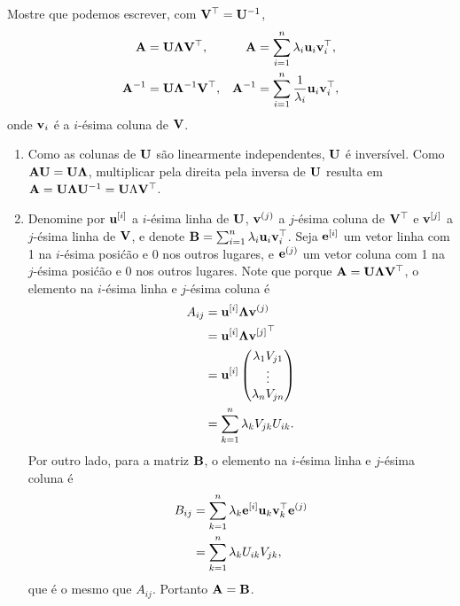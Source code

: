 \begin{exenumerate}
    \item Mostre que podemos escrever, com $\mathbf{V}^\top=\mathbf{U}^{-1}$,
    \begin{align}
        \mathbf{A} &= \mathbf{U} \mathbf{\Lambda} \mathbf{V}^\top,&     \mathbf{A} &= \sum_{i=1}^n \lambda_i \mathbf{u}_i\mathbf{v}_i^\top,\\
        \mathbf{A}^{-1} &= \mathbf{U} \mathbf{\Lambda}^{-1} \mathbf{V}^\top, & \mathbf{A}^{-1} &= \sum_{i=1}^n \frac{1}{\lambda_i} \mathbf{u}_i\mathbf{v}_i^\top,
    \end{align}
    onde $\mathbf{v}_i$ \'e a $i$-\'esima coluna de $\mathbf{V}$.
    \begin{solution}
        \begin{enumerate}
            \item[(i)] Como as colunas de $\mathbf{U}$ s\~ao linearmente independentes,
            $\mathbf{U}$ \'e invers\'ivel. Como $\mathbf{A}\mathbf{U} = \mathbf{U}\mathbf{\Lambda}$, multiplicar pela
            direita pela inversa de $\mathbf{U}$ resulta em $\mathbf{A} = \mathbf{U}\mathbf{\Lambda} \mathbf{U}^{-1} =
            \mathbf{U}\Lambda \mathbf{V}^\top$.
            \item[(ii)] Denomine por $\mathbf{u}^{[i]}$ a $i$-\'esima linha de $\mathbf{U}$,
            $\mathbf{v}^{(j)}$ a $j$-\'esima coluna de $\mathbf{V}^\top$ e $\mathbf{v}^{[j]}$
            a $j$-\'esima linha de $\mathbf{V}$, e denote $\mathbf{B} = \sum_{i=1}^n
            \lambda_i\mathbf{u}_i\mathbf{v}_i^\top$. Seja $\mathbf{e}^{[i]}$ um vetor linha
            com 1 na $i$-\'esima posi\'c\~ao e 0 nos outros lugares, e $\mathbf{e}^{(j)}$ um
            vetor coluna com 1 na $j$-\'esima posi\'c\~ao e 0
            nos outros lugares. Note que porque $\mathbf{A} = \mathbf{U}\mathbf{\Lambda} \mathbf{V}^\top$,
            o elemento na $i$-\'esima linha e $j$-\'esima coluna \'e
            \begin{align}
                A_{ij}  &= \mathbf{u}^{[i]}\mathbf{\Lambda} \mathbf{v}^{(j)} \\
                &= \mathbf{u}^{[i]}\mathbf{\Lambda} {\mathbf{v}^{[j]}}^\top \\
                &= \mathbf{u}^{[i]} \left( \begin{matrix} \lambda_1V_{j1} \\ \vdots \\ \lambda_nV_{jn} \end{matrix} \right) \\
                &= \sum_{k=1}^n \lambda_k V_{jk}U_{ik}.
            \end{align}
            Por outro lado, para a matriz $\mathbf{B}$, o elemento na $i$-\'esima linha e $j$-\'esima coluna \'e
            \begin{align}
                B_{ij}  &= \sum_{k=1}^n \lambda_k\mathbf{e}^{[i]}\mathbf{u}_k\mathbf{v}_k^\top \mathbf{e}^{(j)} \\
                &= \sum_{k=1}^n \lambda_kU_{ik}V_{jk},
            \end{align}
            que \'e o mesmo que $A_{ij}$. Portanto $\mathbf{A} = \mathbf{B}$.
            

\end{enumerate}
\end{solution}
\end{exenumerate}
